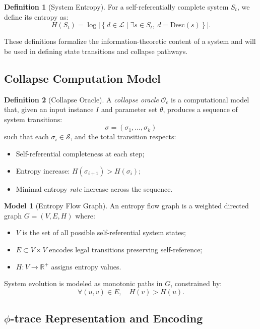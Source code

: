 \documentclass[11pt]{article}
\theoremstyle{remark}
\theoremstyle{definition}
\newtheorem{definition}{Definition}
\newtheorem{model}{Model}
\begin{document}
\begin{definition}[System Entropy]
For a self-referentially complete system $S_t$, we define its entropy as:
\[
H(S_t) = \log \left|\left\{ d \in \mathcal{L} \mid \exists s \in S_t,\ d = \mathrm{Desc}(s) \right\}\right|.
\]
\end{definition}

These definitions formalize the information-theoretic content of a system and will be used in defining state transitions and collapse pathways.

\subsection{Collapse Computation Model}

\begin{definition}[Collapse Oracle]
A \emph{collapse oracle} $\mathcal{O}_c$ is a computational model that, given an input instance $I$ and parameter set $\theta$, produces a sequence of system transitions:
\[
\sigma = (\sigma_1, \ldots, \sigma_k)
\]
such that each $\sigma_i \in \mathcal{S}$, and the total transition respects:
\begin{itemize}
\item Self-referential completeness at each step;
\item Entropy increase: $H(\sigma_{i+1}) > H(\sigma_i)$;
\item Minimal entropy \emph{rate} increase across the sequence.
\end{itemize}
\end{definition}

\begin{model}[Entropy Flow Graph]
An entropy flow graph is a weighted directed graph $G = (V, E, H)$ where:
\begin{itemize}
\item $V$ is the set of all possible self-referential system states;
\item $E \subset V \times V$ encodes legal transitions preserving self-reference;
\item $H: V \rightarrow \mathbb{R}^{+}$ assigns entropy values.
\end{itemize}
System evolution is modeled as monotonic paths in $G$, constrained by:
\[
\forall (u,v) \in E,\quad H(v) > H(u).
\]
\end{model}

\subsection{$\phi$-trace Representation and Encoding}
\end{document}
